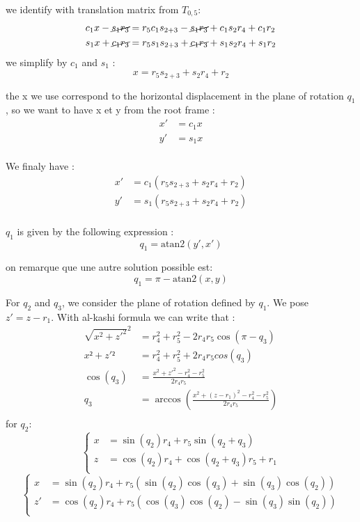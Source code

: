 \documentclass{article}
\begin{document}
we identify with translation matrix from $T_{0,5}$:
\begin{align*}
  c_1x-\cancel{s_1r_3}&=r_5c_1s_{2+3}-\cancel{s_1r_3} +c_1s_2r_4+ c_1r_2\\
  s_1x+\cancel{c_1r_3}&=r_5s_1s_{2+3}+\cancel{c_1r_3}+s_1s_2r_4+s_1r_2\\
\end{align*}
we simplify by $c_1$ and $s_1$ :
\begin{equation}
  x=r_5s_{2+3}+s_2r_4+r_2
\end{equation}

the x we use correspond to the horizontal displacement in the plane of rotation $q_1$, so we want to have x et y from the root frame :
\begin{align*}
  x'&=c_1x\\
  y'&=s_1x\\
\end{align*}

We finaly have :
\begin{align*}
  x'&=c_1(r_5s_{2+3}+s_2r_4+r_2)\\
  y'&=s_1(r_5s_{2+3}+s_2r_4+r_2)\\
\end{align*}

$q_1$ is given by the following expression :
\[
q_1=\text{atan2}(y',x')
\]

on remarque que une autre solution possible est:
\[
q_1=\pi-\text{atan2}(x,y)
\]


For $q_2$ and $q_3$, we consider the plane of rotation defined by $q_1$.
We pose $z'=z-r_1$.
With al-kashi formula we can write that :
\begin{align*}
  \sqrt{x^2+z'^2}^2&=r_4^2+r_5^2-2r_4r_5\cos(\pi-q_3)\\
  x²+z'²&=r_4^2+r_5^2+2r_4r_5cos(q_3)\\
  \cos(q_3)&= \frac{x^2+z'^2-r_4^2-r_5^2}{2r_4r_5}\\
  q_3&=\arccos(\frac{x^2+(z-r_1)^2-r_4^2-r_5^2}{2r_4r_5})\\
\end{align*}
for $q_2$:
\begin{equation}
\begin{cases}
  x&=\sin(q_2)r_4+r_5\sin(q_2+q_3)\\
  z&=\cos(q_2)r_4+\cos(q_2+q_3)r_5 + r_1\\
\end{cases}
\end{equation}
\begin{equation}
\begin{cases}
  x&=\sin(q_2)r_4+r_5(\sin(q_2)\cos(q_3)+\sin(q_3)\cos(q_2))\\
  z'&=\cos(q_2)r_4+r_5(\cos(q_3)\cos(q_2)-\sin(q_3)\sin(q_2))\\
\end{cases}
\end{equation}
\end{document}
